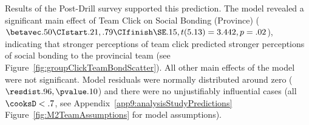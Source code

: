 \begin{CJK}{UTF8}{gbsn}







Results of the Post-Drill survey supported this prediction. The model revealed a significant main effect of Team Click on Social Bonding (Province) ($\betavec .50 \CIstart .21, .79 \CIfinish \SE .15, t(5.13) = 3.442, p = .02$), indicating that stronger perceptions of team click predicted stronger perceptions of social bonding to the provincial team (see Figure~\ref{fig:groupClickTeamBondScatter}).  All other main effects of the model were not significant.  Model residuals were normally distributed around zero ($\resdist .96, \pvalue .10$) and there were no unjustifiably influential cases (all $\cooksD < .7$, see Appendix~\ref{app9:analysisStudyPredictions} Figure~\ref{fig:M2TeamAssumptions} for model assumptions).





\end{CJK}
